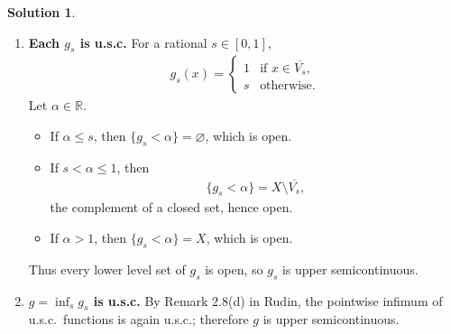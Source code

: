 \documentclass[12pt]{article}
\theoremstyle{definition} %
\newtheorem{solution}{Solution}
\theoremstyle{plain} %
\begin{document}
\begin{solution}
\begin{enumerate}
      \item \textbf{Each $g_s$ is u.s.c.}\;
            For a rational $s\in[0,1]$,
            \begin{align*}
                g_s(x)=
                \begin{cases}
                    1 & \text{if } x\in\overline{V_s},\\[2pt]
                    s & \text{otherwise.}
                \end{cases}
            \end{align*}
            Let $\alpha\in\mathbb{R}$.
            \begin{itemize}
                \item If $\alpha\le s$, then $\{g_s<\alpha\}=\varnothing$, which is open.
                \item If $s<\alpha\le 1$, then
                      \begin{align*}
                          \{g_s<\alpha\}=X\setminus\overline{V_s},
                      \end{align*}
                      the complement of a closed set, hence open.
                \item If $\alpha>1$, then $\{g_s<\alpha\}=X$, which is open.
            \end{itemize}
            Thus every lower level set of $g_s$ is open, so $g_s$ is upper semicontinuous.
  
      \item \textbf{$g=\inf_{s} g_s$ is u.s.c.}\;
            By Remark 2.8(d) in Rudin, the pointwise infimum of u.s.c.\ functions is again u.s.c.; therefore $g$ is upper semicontinuous.
  \end{enumerate}
  \end{solution}
  \pagebreak
\end{document}
